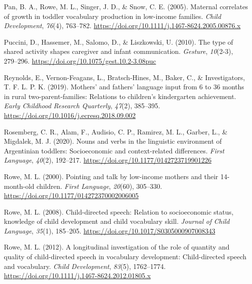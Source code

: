 \documentclass[
  man,mask,floatsintext]{apa6}
\newlength{\cslhangindent}
\newlength{\cslentryspacingunit} %
\newenvironment{CSLReferences}[2] %
 {%
  \setlength{\parindent}{0pt}
  \ifodd #1
  \let\oldpar\par
  \def\par{\hangindent=\cslhangindent\oldpar}
  \fi
  \setlength{\parskip}{#2\cslentryspacingunit}
 }%
 {}
\begin{document}
\begin{CSLReferences}{1}{0}
\leavevmode{}%
Pan, B. A., Rowe, M. L., Singer, J. D., \& Snow, C. E. (2005). Maternal correlates of growth in toddler vocabulary production in low-income families. \emph{Child Development}, \emph{76}(4), 763--782. \url{https://doi.org/10.1111/j.1467-8624.2005.00876.x}

\leavevmode{}%
Puccini, D., Hassemer, M., Salomo, D., \& Liszkowski, U. (2010). The type of shared activity shapes caregiver and infant communication. \emph{Gesture}, \emph{10}(2-3), 279--296. \url{https://doi.org/10.1075/gest.10.2-3.08puc}

\leavevmode{}%
Reynolds, E., Vernon-Feagans, L., Bratsch-Hines, M., Baker, C., \& Investigators, T. F. L. P. K. (2019). Mothers' and fathers' language input from 6 to 36 months in rural two-parent-families: {Relations} to children's kindergarten achievement. \emph{Early Childhood Research Quarterly}, \emph{47}(2), 385--395. \url{https://doi.org/10.1016/j.ecresq.2018.09.002}

\leavevmode{}%
Rosemberg, C. R., Alam, F., Audisio, C. P., Ramirez, M. L., Garber, L., \& Migdalek, M. J. (2020). Nouns and verbs in the linguistic environment of {Argentinian} toddlers: {Socioeconomic} and context-related differences. \emph{First Language}, \emph{40}(2), 192--217. \url{https://doi.org/10.1177/0142723719901226}

\leavevmode{}%
Rowe, M. L. (2000). Pointing and talk by low-income mothers and their 14-month-old children. \emph{First Language}, \emph{20}(60), 305--330. \url{https://doi.org/10.1177/014272370002006005}

\leavevmode{}%
Rowe, M. L. (2008). Child-directed speech: Relation to socioeconomic status, knowledge of child development and child vocabulary skill. \emph{Journal of Child Language}, \emph{35}(1), 185--205. \url{https://doi.org/10.1017/S0305000907008343}

\leavevmode{}%
Rowe, M. L. (2012). A longitudinal investigation of the role of quantity and quality of child-directed speech in vocabulary development: {Child}-directed speech and vocabulary. \emph{Child Development}, \emph{83}(5), 1762--1774. \url{https://doi.org/10.1111/j.1467-8624.2012.01805.x}


\end{CSLReferences}
\end{document}
